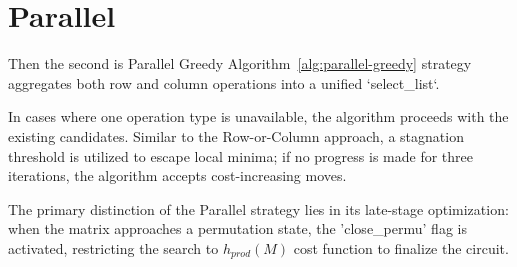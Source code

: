 \section{Parallel}
Then the second is Parallel Greedy Algorithm~\ref{alg:parallel-greedy} strategy aggregates both row and column operations into a unified `select\_list`. 

In cases where one operation type is unavailable, the algorithm proceeds with the existing candidates. Similar to the Row-or-Column approach, a stagnation threshold is utilized to escape local minima; if no progress is made for three iterations, the algorithm accepts cost-increasing moves. 

The primary distinction of the Parallel strategy lies in its late-stage optimization: when the matrix approaches a permutation state, the 'close\_permu' flag is activated, restricting the search to $h_{prod}(M)$ cost function to finalize the circuit.

